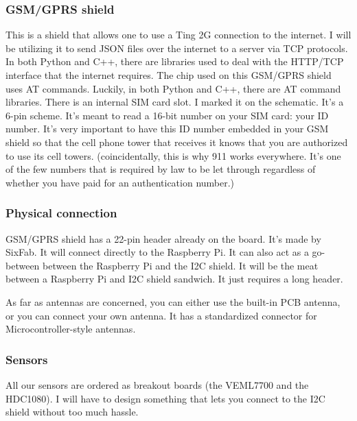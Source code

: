 \subsubsection{GSM/GPRS shield}
This is a shield that allows one to use a Ting 2G connection to the internet. I will be utilizing it to send JSON files over the internet to a server via TCP protocols. In both Python and C++, there are libraries used to deal with the HTTP/TCP interface that the internet requires. The chip used on this GSM/GPRS shield uses AT commands. Luckily, in both Python and C++, there are AT command libraries.
There is an internal SIM card slot. I marked it on the schematic. It’s a 6-pin scheme. It’s meant to read a 16-bit number on your SIM card: your ID number. It’s very important to have this ID number embedded in your GSM shield so that the cell phone tower that receives it knows that you are authorized to use its cell towers. (coincidentally, this is why 911 works everywhere. It’s one of the few numbers that is required by law to be let through regardless of whether you have paid for an authentication number.)

\subsubsection{Physical connection}
GSM/GPRS shield has a 22-pin header already on the board. It’s made by SixFab. It will connect directly to the Raspberry Pi. It can also act as a go-between between the Raspberry Pi and the I2C shield. It will be the meat between a Raspberry Pi and I2C shield sandwich. It just requires a long header.

As far as antennas are concerned, you can either use the built-in PCB antenna, or you can connect your own antenna. It has a standardized connector for Microcontroller-style antennas.
\subsubsection{Sensors}
All our sensors are ordered as breakout boards (the VEML7700 and the HDC1080). I will have to design something that lets you connect to the I2C shield without too much hassle.

